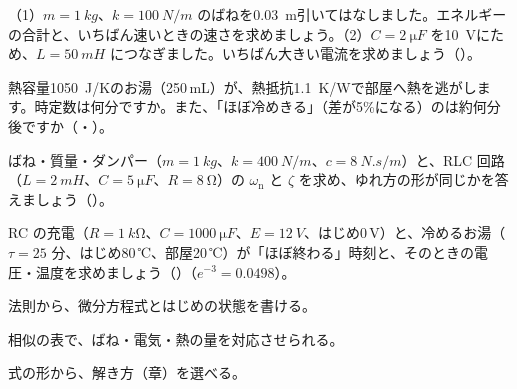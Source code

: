 
\bkproblem （1）$m=\qty{1}{kg}$、$k=\qty{100}{N/m}$ のばねを\qty{0.03}{m}引いてはなしました。エネルギーの合計と、いちばん速いときの速さを求めましょう。\newline （2）$C=\qty{2}{\micro F}$ を\qty{10}{V}にため、$L=\qty{50}{mH}$ につなぎました。いちばん大きい電流を求めましょう\mbox{（）}。

\bkproblem 熱容量\qty{1050}{J/K}のお湯（250\,mL）が、熱抵抗\qty{1.1}{K/W}で部屋へ熱を逃がします。時定数は何分ですか。また、「ほぼ冷めきる」（差が5\%になる）のは約何分後ですか\mbox{（・）}。

\bkproblem ばね・質量・ダンパー（$m=\qty{1}{kg}$、$k=\qty{400}{N/m}$、$c=\qty{8}{N.s/m}$）と、RLC 回路（$L=\qty{2}{mH}$、$C=\qty{5}{\micro F}$、$R=\qty{8}{\ohm}$）の $\omega_{\mathrm n}$ と $\zeta$ を求め、ゆれ方の形が同じかを答えましょう\mbox{（）}。

\bkproblem RC の充電（$R=\qty{1}{k\ohm}$、$C=\qty{1000}{\micro F}$、$E=\qty{12}{V}$、はじめ0\,V）と、冷めるお湯（$\tau=25$ 分、はじめ80\,℃、部屋20\,℃）が「ほぼ終わる」時刻と、そのときの電圧・温度を求めましょう\mbox{（）}（$e^{-3}=0.0498$）。

\begin{furikaeri}
\begin{checklist}
\item 法則から、微分方程式とはじめの状態を書ける。
\item 相似の表で、ばね・電気・熱の量を対応させられる。
\item 式の形から、解き方（章）を選べる。
\end{checklist}
\end{furikaeri}


